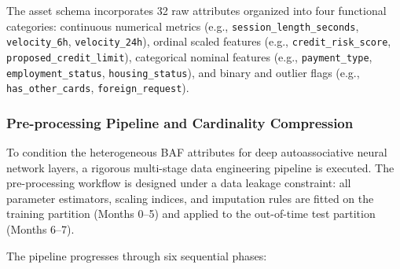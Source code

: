 The asset schema incorporates 32 raw attributes organized into four functional categories: continuous numerical metrics (e.g., \texttt{session\_length\_seconds}, \texttt{velocity\_6h}, \texttt{velocity\_24h}), ordinal scaled features (e.g., \texttt{credit\_risk\_score}, \texttt{proposed\_credit\_limit}), categorical nominal features (e.g., \texttt{payment\_type}, \texttt{employment\_status}, \texttt{housing\_status}), and binary and outlier flags (e.g., \texttt{has\_other\_cards}, \texttt{foreign\_request}).

\subsubsection{Pre-processing Pipeline and Cardinality Compression}

To condition the heterogeneous BAF attributes for deep autoassociative neural network layers, a rigorous multi-stage data engineering pipeline is executed. The pre-processing workflow is designed under a data leakage constraint: all parameter estimators, scaling indices, and imputation rules are fitted on the training partition (Months 0--5) and applied to the out-of-time test partition (Months 6--7).

The pipeline progresses through six sequential phases:

